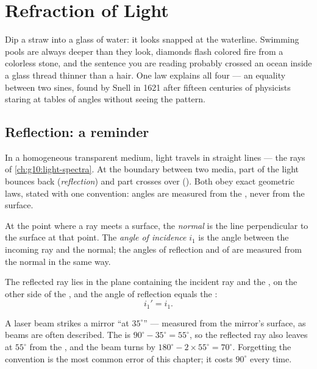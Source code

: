 \chapter{Refraction of Light}\label{ch:g10:refraction}

Dip a straw into a glass of water: it looks snapped at the waterline.
Swimming pools are always deeper than they look, diamonds flash colored
fire from a colorless stone, and the sentence you are reading probably
crossed an ocean inside a glass thread thinner than a hair. One law
explains all four --- an equality between two sines, found by Snell in
1621 after fifteen centuries of physicists staring at tables of angles
without seeing the pattern.

\section{Reflection: a reminder}

In a homogeneous transparent medium, light travels in straight lines ---
the rays of \cref{ch:g10:light-spectra}. At the boundary between two
media, part of the light bounces back (\emph{reflection}) and part
crosses over (\emph{}). Both obey exact geometric laws, stated
with one convention: angles are measured from the \emph{}, never
from the surface.

\begin{definition}\label{def:g10:refraction:angles}
At the point where a ray meets a surface, the
\emph{normal} is the line perpendicular to the surface at
that point. The \emph{angle of incidence} $i_1$
is the angle between the incoming ray and the normal; the angles of
reflection and of  are measured from the normal in the same
way.
\end{definition}

\begin{proposition}\label{prop:g10:refraction:reflection}
The reflected ray lies in the plane containing the incident ray and the
, on the other side of the , and the angle of reflection
equals the :
\[
i_1' = i_1 .
\]
\end{proposition}
\admitted

\begin{example}\label{ex:g10:refraction:mirror}
A laser beam strikes a mirror ``at $35^\circ$'' --- measured from the
mirror's surface, as beams are often described. The  is
$90^\circ - 35^\circ = 55^\circ$, so the reflected ray also leaves at
$55^\circ$ from the , and the beam turns by
$180^\circ - 2 \times 55^\circ = 70^\circ$. Forgetting the
 convention is the most common error of this chapter; it costs
$90^\circ$ every time.
\end{example}

